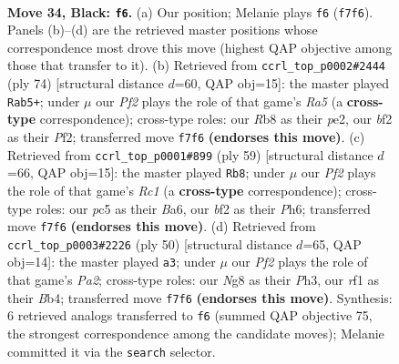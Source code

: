 \documentclass[11pt]{article}
\begin{document}
\clearpage

\begin{figure}[p]\centering
\begin{subfigure}{0.46\textwidth}\centering
\resizebox{\linewidth}{!}{%
\newchessgame
\chessboard[
  setfen={1rk3nb/p4p1p/P1p5/2P2N2/1r2P3/8/5B2/3R1RK1 b - - 4 34},
  showmover=false,
  pgfstyle=straightmove, color=movearrow, markmove={f7-f6}
]}
\caption{}
\end{subfigure}\hfill
\begin{subfigure}{0.46\textwidth}\centering
\resizebox{\linewidth}{!}{%
\newchessgame
\chessboard[
  setfen={1k1r4/6p1/4Pbnr/R1R4p/5p2/B4P1P/4pP2/7K w - - 15 38},
  showmover=false,
  pgfstyle=straightmove, color=movearrow, markmove={a5-b5}
]}
\caption{}
\end{subfigure}
\\[4pt]
\begin{subfigure}{0.46\textwidth}\centering
\resizebox{\linewidth}{!}{%
\newchessgame
\chessboard[
  setfen={2r3k1/5p2/bp4pp/2r5/3Np1P1/P3P3/5P1P/RR4K1 b - - 0 30},
  showmover=false,
  pgfstyle=straightmove, color=movearrow, markmove={c8-b8}
]}
\caption{}
\end{subfigure}\hfill
\begin{subfigure}{0.46\textwidth}\centering
\resizebox{\linewidth}{!}{%
\newchessgame
\chessboard[
  setfen={1rr3k1/p2b1p1p/5Rp1/3P4/1B6/7P/P5P1/5RK1 w - - 1 26},
  showmover=false,
  pgfstyle=straightmove, color=movearrow, markmove={a2-a3}
]}
\caption{}
\end{subfigure}
\caption{\textbf{Move 34, Black: \texttt{f6}.} (a) Our position; Melanie plays \texttt{f6} (\texttt{f7f6}). Panels (b)--(d) are the retrieved master positions whose correspondence most drove this move (highest QAP objective among those that transfer to it). (b) Retrieved from \texttt{ccrl\_top\_p0002\#2444} (ply 74) [structural distance $d$=60, QAP obj=15]: the master played \texttt{Rab5+}; under $\mu$ our \emph{Pf2} plays the role of that game's \emph{Ra5} (a \textbf{cross-type} correspondence); cross-type roles: our \emph{R}b8 as their \emph{p}e2, our \emph{b}f2 as their \emph{P}f2; transferred move \texttt{f7f6} \textbf{(endorses this move)}. (c) Retrieved from \texttt{ccrl\_top\_p0001\#899} (ply 59) [structural distance $d$=66, QAP obj=15]: the master played \texttt{Rb8}; under $\mu$ our \emph{Pf2} plays the role of that game's \emph{Rc1} (a \textbf{cross-type} correspondence); cross-type roles: our \emph{p}c5 as their \emph{B}a6, our \emph{b}f2 as their \emph{P}h6; transferred move \texttt{f7f6} \textbf{(endorses this move)}. (d) Retrieved from \texttt{ccrl\_top\_p0003\#2226} (ply 50) [structural distance $d$=65, QAP obj=14]: the master played \texttt{a3}; under $\mu$ our \emph{Pf2} plays the role of that game's \emph{Pa2}; cross-type roles: our \emph{N}g8 as their \emph{P}h3, our \emph{r}f1 as their \emph{B}b4; transferred move \texttt{f7f6} \textbf{(endorses this move)}. Synthesis: 6 retrieved analogs transferred to \texttt{f6} (summed QAP objective 75, the strongest correspondence among the candidate moves); Melanie committed it via the \texttt{search} selector.}
\label{fig:thought-m67}
\end{figure}
\end{document}

